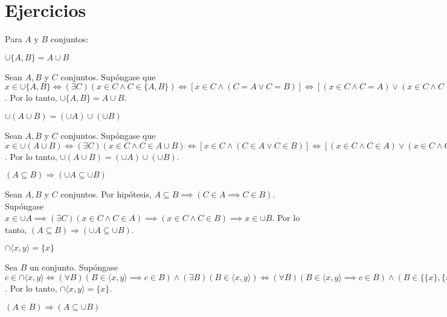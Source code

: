 





\section{Ejercicios}
Para $A$ y  $B$ conjuntos:
\begin{problema}
$\cup\{A, B\}=A \cup B$
\end{problema}

\begin{dem}
	Sean $A, B$ y $C$ conjuntos. Supóngase que $x\in \cup\{A,B\}\iff (\exists C)(x\in C\wedge C\in \{A,B\})\iff [x\in C\wedge (C=A \vee C= B)]\iff [(x\in C\wedge C=A)\vee (x\in C\wedge C=B)]\iff x\in A\vee x\in B \iff x\in A\cup B$. Por lo tanto, $\cup\{A, B\}=A \cup B$. 
\end{dem}
\begin{problema}
 $\cup(A \cup B)=(\cup A) \cup(\cup B)$
\end{problema}

\begin{dem}
	Sean $A, B$ y $C$ conjuntos. Supóngase que $x\in \cup(A\cup B)\iff (\exists C)(x\in C\wedge C\in A\cup B)\iff [x\in C\wedge (C\in A \vee C\in B)]\iff [(x\in C\wedge C\in A)\vee (x\in C\wedge C\in B)]\iff x\in (\cup A)\cup (\cup B)$. Por lo tanto, $\cup(A \cup B)=(\cup A) \cup(\cup B)$.
\end{dem}
\begin{problema}
$(A \subseteq B) \Rightarrow(\cup A \subseteq \cup B)$
\end{problema}

\begin{dem}
		Sean $A, B$ y $C$ conjuntos. Por hipótesis, $A\subseteq B\implies (C\in A \implies C\in B)$. Supóngase $x\in \cup A\implies (\exists C)(x\in C\wedge C\in A)\implies (x\in C\wedge C\in B)\implies x\in \cup B$. Por lo tanto, $(A \subseteq B) \Rightarrow(\cup A \subseteq \cup B)$.
\end{dem}
\begin{problema}
	$\cap\langle x, y\rangle=\{x\}$
\end{problema}

\begin{dem}
	Sea $B$ un conjunto. Supóngase $c\in \cap \langle x,y\rangle \iff (\forall B)(B\in \langle x,y\rangle \implies c\in B)\wedge (\exists B)(B\in \langle x,y\rangle )\iff (\forall B)(B\in \langle x,y\rangle \implies c\in B)\wedge(B\in \{\{x\},\{x,y\}\})\iff (\forall B)(B\in \langle x,y\rangle \implies c\in B)\wedge (B=\{x\}\vee B=\{x,y\})\iff (c\in B\wedge B=\{x\})\vee (c\in B\wedge B=\{x,y\})\iff c\in \{x\}\wedge c\in \{x,y\}$. Por lo tanto, $\cap\langle x, y\rangle=\{x\}$.
\end{dem}
\begin{problema}
	$(A \in B) \Rightarrow(A \subseteq \cup B)$
\end{problema}

